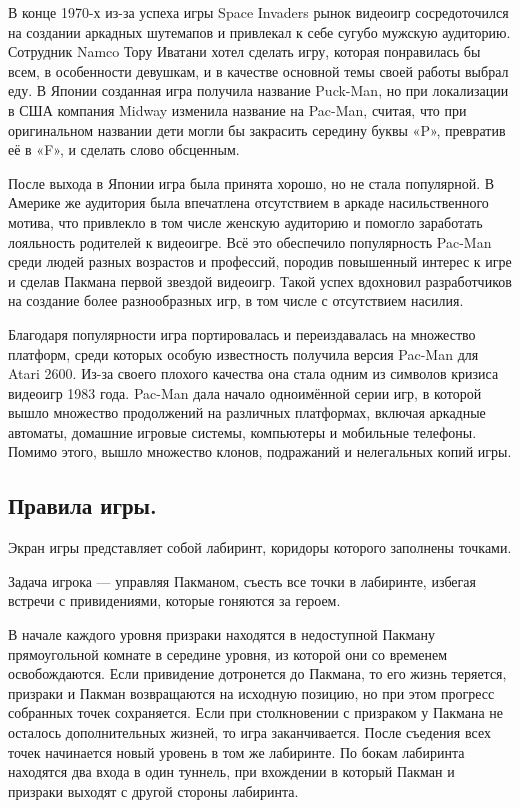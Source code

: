 В конце 1970-х из-за успеха игры Space Invaders рынок видеоигр сосредоточился на создании аркадных шутемапов и привлекал к себе сугубо мужскую аудиторию. Сотрудник Namco Тору Иватани хотел сделать игру, которая понравилась бы всем, в особенности девушкам, и в качестве основной темы своей работы выбрал еду. В Японии созданная игра получила название Puck-Man, но при локализации в США компания Midway изменила название на Pac-Man, считая, что при оригинальном названии дети могли бы закрасить середину буквы «P», превратив её в «F», и сделать слово обсценным.

После выхода в Японии игра была принята хорошо, но не стала популярной. В Америке же аудитория была впечатлена отсутствием в аркаде насильственного мотива, что привлекло в том числе женскую аудиторию и помогло заработать лояльность родителей к видеоигре. Всё это обеспечило популярность Pac-Man среди людей разных возрастов и профессий, породив повышенный интерес к игре и сделав Пакмана первой звездой видеоигр. Такой успех вдохновил разработчиков на создание более разнообразных игр, в том числе с отсутствием насилия.

Благодаря популярности игра портировалась и переиздавалась на множество платформ, среди которых особую известность получила версия Pac-Man для Atari 2600. Из-за своего плохого качества она стала одним из символов кризиса видеоигр 1983 года. Pac-Man дала начало одноимённой серии игр, в которой вышло множество продолжений на различных платформах, включая аркадные автоматы, домашние игровые системы, компьютеры и мобильные телефоны. Помимо этого, вышло множество клонов, подражаний и нелегальных копий игры.

\subsection{\label{subsec:ch01/sec04/subsec02}Правила игры.}
Экран игры представляет собой лабиринт, коридоры которого заполнены точками.

Задача игрока --- управляя Пакманом, съесть все точки в лабиринте, избегая встречи с привидениями, которые гоняются за героем.

В начале каждого уровня призраки находятся в недоступной Пакману прямоугольной комнате в середине уровня, из которой они со временем освобождаются. Если привидение дотронется до Пакмана, то его жизнь теряется, призраки и Пакман возвращаются на исходную позицию, но при этом прогресс собранных точек сохраняется. Если при столкновении с призраком у Пакмана не осталось дополнительных жизней, то игра заканчивается. После съедения всех точек начинается новый уровень в том же лабиринте. По бокам лабиринта находятся два входа в один туннель, при вхождении в который Пакман и призраки выходят с другой стороны лабиринта.

